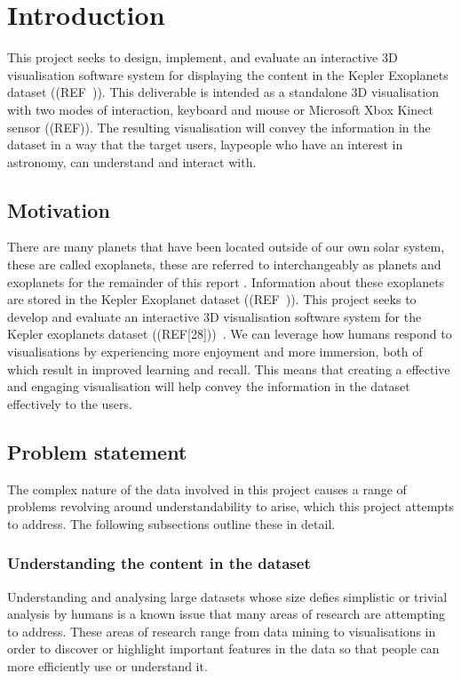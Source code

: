 \chapter{Introduction}\label{C:intro}
This project seeks to design, implement, and evaluate an interactive 3D
visualisation software system for displaying the content in the Kepler
Exoplanets dataset ((REF~)). This deliverable is intended as a standalone 3D
visualisation with two modes of interaction, keyboard and mouse or Microsoft
Xbox Kinect sensor ((REF)). The resulting visualisation will convey the
information in the dataset in a way that the target users, laypeople who have an
interest in astronomy, can understand and interact with.
\section{Motivation}
There are many planets that have been located outside of our own solar system,
these are
called exoplanets, these are referred to interchangeably as planets and
exoplanets for the remainder of this report
. Information about these exoplanets are stored in the Kepler Exoplanet dataset
((REF~)). This project seeks to develop and evaluate an interactive 3D
visualisation
software system for the Kepler exoplanets dataset ((REF[28]))~. We can leverage
how humans respond to visualisations by experiencing more enjoyment and more
immersion, both of which result in improved learning and recall. This means that
creating a effective and engaging visualisation will help convey the information
in the dataset effectively to the users.
\section{Problem statement}
The complex nature of the data involved in this project causes a range of
problems revolving around understandability to arise, which this project
attempts to address. The following subsections outline these in detail.

\subsection{Understanding the content in the dataset}
Understanding and analysing large datasets whose size defies simplistic or
trivial analysis by humans is a known issue that many areas of research are
attempting to address. These areas of research range from data mining to
visualisations in order to discover or highlight important features in the data
so that people can more efficiently use or understand it. 

